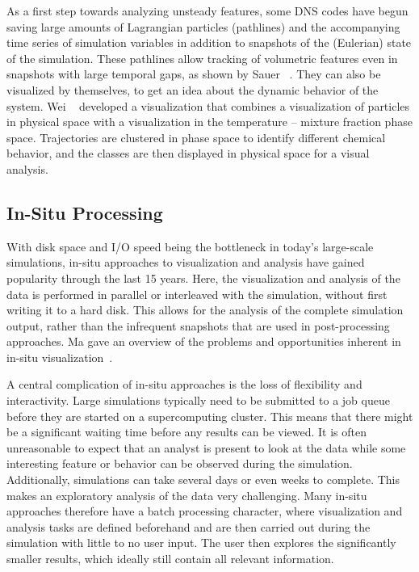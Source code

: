 %
As a first step towards analyzing unsteady features, some \ac{DNS} codes have
begun saving large amounts of Lagrangian particles (pathlines) and the
accompanying time series of simulation variables in addition to snapshots of the
(Eulerian) state of the simulation.
%
These pathlines allow tracking of volumetric features even in snapshots with
large temporal gaps, as shown by Sauer \etal~\cite{Sauer2014}.
%
They can also be visualized by themselves, to get an idea about the dynamic
behavior of the system.
%
Wei \etal~\cite{Wei2011} developed a visualization that combines a visualization
of particles in physical space with a visualization in the temperature --
mixture fraction phase space.
%
Trajectories are clustered in phase space to identify different chemical
behavior, and the classes are then displayed in physical space for a visual
analysis.
%
%
%
\subsection{In-Situ Processing} %
\label{sub:in_situ_processing}
%
With disk space and I/O speed being the bottleneck in today's large-scale
simulations, in-situ approaches to visualization and analysis have gained
popularity through the last 15 years.
%
Here, the visualization and analysis of the data is performed in parallel or
interleaved with the simulation, without first writing it to a hard disk.
%
This allows for the analysis of the complete simulation output, rather than
the infrequent snapshots that are used in post-processing approaches.
%
Ma gave an overview of the problems and opportunities inherent in in-situ
visualization~\cite{Ma2009}.
%

%
A central complication of in-situ approaches is the loss of flexibility and
interactivity.
%
Large simulations typically need to be submitted to a job queue before they are
started on a supercomputing cluster.
%
This means that there might be a significant waiting time before any results can
be viewed.
%
It is often unreasonable to expect that an analyst is present to look at the
data while some interesting feature or behavior can be observed during the
simulation.
%
Additionally, simulations can take several days or even weeks to complete.
%
This makes an exploratory analysis of the data very challenging.
%
Many in-situ approaches therefore have a batch processing character, where
visualization and analysis tasks are defined beforehand and are then
carried out during the simulation with little to no user input.
%
The user then explores the significantly smaller results, which ideally still
contain all relevant information.
%

